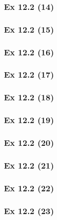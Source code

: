 \subsubsection{Ex 12.2 (14)}\label{sec:Ex_12.2.14}

\subsubsection{Ex 12.2 (15)}\label{sec:Ex_12.2.15}

\subsubsection{Ex 12.2 (16)}\label{sec:Ex_12.2.16}

\subsubsection{Ex 12.2 (17)}\label{sec:Ex_12.2.17}

\subsubsection{Ex 12.2 (18)}\label{sec:Ex_12.2.18}

\subsubsection{Ex 12.2 (19)}\label{sec:Ex_12.2.19}

\subsubsection{Ex 12.2 (20)}\label{sec:Ex_12.2.20}

\newpage		%

\subsubsection{Ex 12.2 (21)}\label{sec:Ex_12.2.21}

\subsubsection{Ex 12.2 (22)}\label{sec:Ex_12.2.22}

\subsubsection{Ex 12.2 (23)}\label{sec:Ex_12.2.23}

